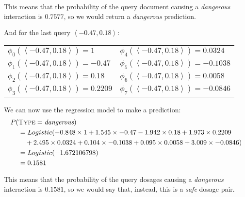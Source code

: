 \documentclass[solution]{ditpaper}
\begin{document}
\begin{enumerate}
\begin{answer}
\noindent This means that the probability of the query document causing a \textit{dangerous} interaction is $0.7577$, so we would return a \textit{dangerous} prediction.

And for the last query $\left<-0.47, 0.18\right>$:
			\begin{center}
\begin{tabular}[ht]{ l  l  }
$\phi_0(\left<-0.47, 0.18\right>) =  1$ & $\phi_4(\left<-0.47, 0.18\right>) = 0.0324$ \\
$\phi_1(\left<-0.47, 0.18\right>) = -0.47$ & $\phi_5(\left<-0.47, 0.18\right>) = -0.1038$ \\
$\phi_2(\left<-0.47, 0.18\right>) = 0.18$ &$\phi_6(\left<-0.47, 0.18\right>) = 0.0058$  \\
$\phi_3(\left<-0.47, 0.18\right>) = 0.2209$ & $\phi_7(\left<-0.47, 0.18\right>) = -0.0846$ \\
\end{tabular}
\end{center}
	We can now use the regression model to make a prediction:
		\begin{alignat*}{2}				
P(&\textsc{Type}=\textit{dangerous}) \\
& = Logistic(-0.848\times 1 + 1.545 \times -0.47 -1.942 \times  0.18 + 1.973 \times 0.2209 \\
&  ~~~  +  2.495   \times 0.0324 + 0.104 \times -0.1038 + 0.095 \times 0.0058 + 3.009\times -0.0846) \\
& = Logistic(-1.672106798)  \\
& = 0.1581 
\end{alignat*}
 
\noindent This means that the probability of the query dosages causing a \textit{dangerous} interaction is $0.1581$, so we would say that, instead, this is a \textit{safe} dosage pair. 
		\end{answer}
		\end{enumerate}

\clearpage
\end{document}

